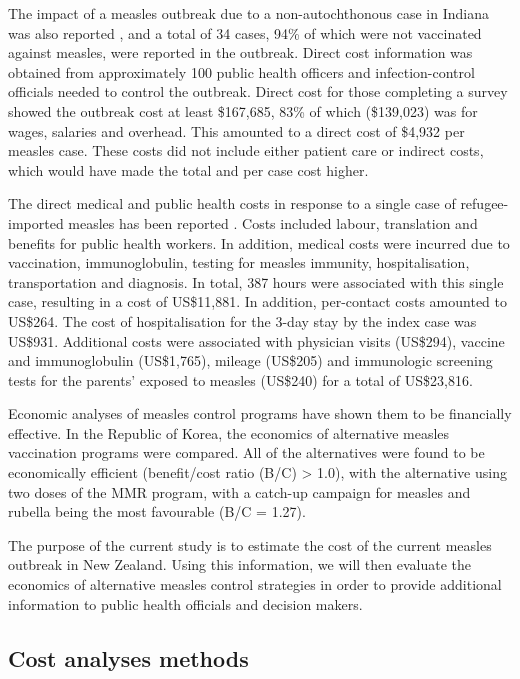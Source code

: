 \documentclass{article}
\begin{document}
\begin{itemize}
The impact of a measles outbreak due to a non-autochthonous case in Indiana was also reported \citep{parker6}, and a total of 34 cases, 94\% of which were not vaccinated against measles, were reported in the outbreak. Direct cost information was obtained from approximately 100 public health officers and infection-control officials needed to control the outbreak. Direct cost for those completing a survey showed the outbreak cost at least \$167,685, 83\% of which (\$139,023) was for wages, salaries and overhead. This amounted to a direct cost of \$4,932 per measles case. These costs did not include either patient care or indirect costs, which would have made the total and per case cost higher.

The direct medical and public health costs in response to a single case of refugee-imported measles has been reported \citep{coleman12}.  Costs included labour, translation and benefits for public health workers. In addition, medical costs were incurred due to vaccination, immunoglobulin, testing for measles immunity, hospitalisation, transportation and diagnosis. In total, 387 hours were associated with this single case, resulting in a cost of US\$11,881. In addition, per-contact costs amounted to US\$264. The cost of hospitalisation for the 3-day stay by the index case was US\$931. Additional costs were associated with physician visits (US\$294), vaccine and immunoglobulin (US\$1,765), mileage (US\$205) and immunologic screening tests for the parents' exposed to measles (US\$240) for a total of US\$23,816.

Economic analyses of measles control programs have shown them to be financially effective. In the Republic of Korea, the economics of alternative measles vaccination programs were compared. All of the alternatives were found to be economically efficient (benefit/cost ratio (B/C) > 1.0), with the alternative using two doses of the MMR program, with a catch-up campaign for measles and rubella being the most favourable (B/C = 1.27).

The purpose of the current study is to estimate the cost of the current measles outbreak in New Zealand. Using this information, we will then evaluate the economics of alternative measles control strategies in order to provide additional information to public health officials and decision makers.

\subsection{Cost analyses methods}
\label{sub:cost}


\end{itemize}
\end{document}
